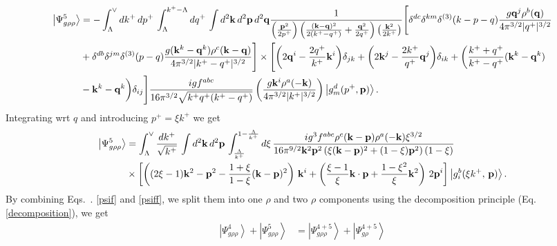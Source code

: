 \documentclass[aps,prd,amsmath,amssymb,nofootinbib]{revtex4-2}
\numberwithin{equation}{section}
\begin{document}
\begin{align}\label{subsgrhorhoabs}
\left|\Psi_{g\rho\rho}^{5}\right\rangle & =-\int_{\Lambda}^{\vee}dk^{+}\,dp^{+}\,\int_{\Lambda}^{k^{+}-\Lambda}dq^{+}\,\int d^{2}\mathbf{k}\,d^{2}\mathbf{p}\,d^{2}\mathbf{q}\frac{1}{\left(\frac{\mathbf{p}^{2}}{2p^{+}}\right)\left(\frac{(\mathbf{k}-\mathbf{q})^{2}}{2(k^{+}-q^{+})}+\frac{\mathbf{q}^{2}}{2q^{+}}\right)\left(\frac{\mathbf{k}^{2}}{2k^{+}}\right)}\Bigg[\delta^{dc}\delta^{km}\delta^{(3)}(k-p-q)\frac{g\mathbf{q}^{j}\rho^{b}(\mathbf{q})}{4\pi^{3/2}|q^{+}|^{3/2}}\notag \\ & +\delta^{db}\delta^{jm}\delta^{(3)}(p-q)\frac{g(\mathbf{k}^{k}-\mathbf{q}^{k})\rho^{c}(\mathbf{k}-\mathbf{q})}{4\pi^{3/2}|k^{+}-q^{+}|^{3/2}}\Bigg]\times\Bigg[\bigg(2\mathbf{q}^{i}-\frac{2q^{+}}{k^{+}}\mathbf{k}^{i}\bigg)\delta_{jk}+\bigg(2\mathbf{k}^{j}-\frac{2k^{+}}{q^{+}}\mathbf{q}^{j}\bigg)\delta_{ik}+\bigg(\frac{k^{+}+q^{+}}{k^{+}-q^{+}}(\mathbf{k}^{k}-\mathbf{q}^{k})\notag \\ & -\mathbf{k}^{k}-\mathbf{q}^{k}\bigg)\delta_{ij}\Bigg]\frac{igf^{abc}}{16\pi^{3/2}\sqrt{k^{+}q^{+}(k^{+}-q^{+})}}\left(\frac{g\mathbf{k}^{i}\rho^{a}(-\mathbf{k})}{4\pi^{3/2}|k^{+}|^{3/2}}\right)\left|g_{m}^{d}(p^{+},\mathbf{p})\right\rangle .
\end{align}
Integrating wrt $q$ and introducing $p^{+} = \xi k^{+}$ we get
\begin{align}\label{psiff}
 \left|\Psi_{g\rho\rho}^{5}\right\rangle & =\int_{\Lambda}^{\vee}\frac{dk^{+}}{\sqrt{k^{+}}}\,\int d^{2}\mathbf{k}\, d^{2}\mathbf{p}\,\int_{\frac{\Lambda}{k^{+}}}^{1-\frac{\Lambda}{k^{+}}}d\xi\,\frac{ig^{3}f^{abc}\rho^{c}(\mathbf{k}-\mathbf{p})\rho^{a}(-\mathbf{k})\xi^{3/2}}{16\pi^{9/2}\mathbf{k}^{2}\mathbf{p}^{2}\left(\xi(\mathbf{k}-\mathbf{p})^{2}+(1-\xi)\mathbf{p}^{2}\right)(1-\xi)}\notag \\
&\times\left[\left((2\xi-1)\mathbf{k}^{2}-\mathbf{p}^{2}-\frac{1+\xi}{1-\xi}(\mathbf{k}-\mathbf{p})^{2}\right)\,\mathbf{k}^{i}+\left(\frac{\xi-1}{\xi}\mathbf{k}\cdot \mathbf{p}+\frac{1-\xi^{2}}{\xi}\mathbf{k}^{2}\right)\,2\mathbf{p}^{i}\right]\left|g_{i}^{b}(\xi k^{+},\, \mathbf{p})\right\rangle.  
\end{align}
By combining Eqs.~. \eqref{psif} and \eqref{psiff}, we split them into one $\rho$ and two $\rho$ components using the decomposition principle (Eq.~ \eqref{decomposition}), we get 
\begin{align}
    \left|\Psi_{g\rho\rho}^{4}\right\rangle + \left|\Psi_{g\rho\rho}^{5}\right\rangle & =  \left|\Psi_{g\rho\rho}^{4+5}\right\rangle + \left|\Psi_{g\rho}^{4+5}\right\rangle
\end{align}
\end{document}
